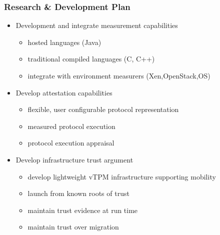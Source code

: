 \documentclass{beamer}
\begin{document}
\begin{frame}
  \frametitle{Research \& Development Plan}
  \begin{itemize}
  \item Development and integrate measurement capabilities
    \begin{itemize}
    \item hosted languages (Java)
    \item traditional compiled languages (C, C++)
    \item integrate with environment measurers (Xen,OpenStack,OS)
    \end{itemize}
  \item Develop attestation capabilities
    \begin{itemize}
    \item flexible, user configurable protocol representation
    \item measured protocol execution
    \item protocol execution appraisal
    \end{itemize}
  \item Develop infrastructure trust argument
    \begin{itemize}
    \item develop lightweight vTPM infrastructure supporting mobility
    \item launch from known roots of trust
    \item maintain trust evidence at run time
    \item maintain trust over migration
    \end{itemize}
  \end{itemize}
\end{frame}
\end{document}
